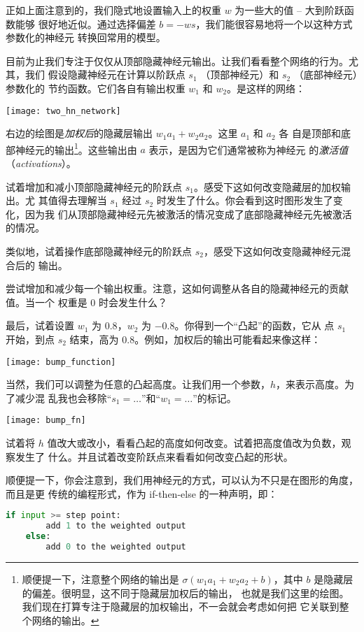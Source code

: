 正如上面注意到的，我们隐式地设置输入上的权重 $w$ 为一些大的值 -- 大到阶跃函数能够
很好地近似。通过选择偏差 $b = -ws$，我们能很容易地将一个以这种方式参数化的神经元
转换回常用的模型。

目前为止我们专注于仅仅从顶部隐藏神经元输出。让我们看看整个网络的行为。尤其，我们
假设隐藏神经元在计算以阶跃点 $s_1$ （顶部神经元）和 $s_2$ （底部神经元）参数化的
节约函数。它们各自有输出权重 $w_1$ 和 $w_2$。是这样的网络：
\begin{center}
  \texttt{[image: two\_hn\_network]}
\end{center}

右边的绘图是\emph{加权后}的隐藏层输出 $w_1 a_1 + w_2 a_2$。这里 $a_1$ 和 $a_2$ 各
自是顶部和底部神经元的输出\footnote{顺便提一下，注意整个网络的输出是 $\sigma(w_1
  a_1+w_2 a_2 + b)$，其中 $b$ 是隐藏层的偏差。很明显，这不同于隐藏层加权后的输出，
  也就是我们这里的绘图。我们现在打算专注于隐藏层的加权输出，不一会就会考虑如何把
  它关联到整个网络的输出。}。这些输出由 $a$ 表示，是因为它们通常被称为神经元
的\emph{激活值}（\textit{activations}）。

试着增加和减小顶部隐藏神经元的阶跃点 $s_1$。感受下这如何改变隐藏层的加权输出。尤
其值得去理解当 $s_1$ 经过 $s_2$ 时发生了什么。你会看到这时图形发生了变化，因为我
们从顶部隐藏神经元先被激活的情况变成了底部隐藏神经元先被激活的情况。

类似地，试着操作底部隐藏神经元的阶跃点 $s_2$，感受下这如何改变隐藏神经元混合后的
输出。

尝试增加和减少每一个输出权重。注意，这如何调整从各自的隐藏神经元的贡献值。当一个
权重是 0 时会发生什么？

最后，试着设置 $w_1$ 为 $0.8$，$w_2$ 为 $-0.8$。你得到一个“凸起”的函数，它从
点 $s_1$ 开始，到点 $s_2$ 结束，高为 $0.8$。例如，加权后的输出可能看起来像这样：
\begin{center}
  \texttt{[image: bump\_function]}
\end{center}

当然，我们可以调整为任意的凸起高度。让我们用一个参数，$h$，来表示高度。为了减少混
乱我也会移除“$s_1 = \ldots$”和“$w_1 = \ldots$”的标记。
\begin{center}
  \texttt{[image: bump\_fn]}
\end{center}

试着将 $h$ 值改大或改小，看看凸起的高度如何改变。试着把高度值改为负数，观察发生了
什么。并且试着改变阶跃点来看看如何改变凸起的形状。

顺便提一下，你会注意到，我们用神经元的方式，可以认为不只是在图形的角度，而且是更
传统的编程形式，作为 {\serif if-then-else} 的一种声明，即：
\begin{lstlisting}[language=Python]
    if input >= step point:
        add 1 to the weighted output
    else:
        add 0 to the weighted output  
\end{lstlisting}

